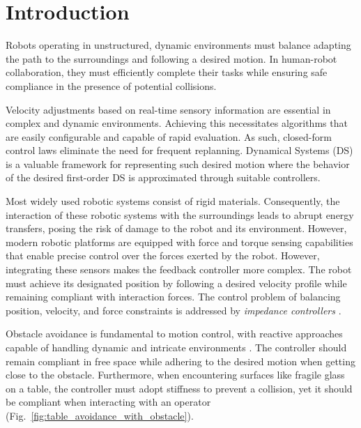 \section{Introduction}
Robots operating in unstructured, dynamic environments must balance adapting the path to the surroundings and following a desired motion. In human-robot collaboration, they must efficiently complete their tasks while ensuring safe compliance in the presence of potential collisions.

Velocity adjustments based on real-time sensory information are essential in complex and dynamic environments. Achieving this necessitates algorithms that are easily configurable and capable of rapid evaluation. As such, closed-form control laws eliminate the need for frequent replanning. Dynamical Systems (DS) is a valuable framework for representing such desired motion \cite{huber2019avoidance} where the behavior of the desired first-order DS is approximated through suitable controllers. 

Most widely used robotic systems consist of rigid materials. Consequently, the interaction of these robotic systems with the surroundings leads to abrupt energy transfers, posing the risk of damage to the robot and its environment. However, modern robotic platforms are equipped with force and torque sensing capabilities that enable precise control over the forces exerted by the robot.
However, integrating these sensors makes the feedback controller more complex. The robot must achieve its designated position by following a desired velocity profile while remaining compliant with interaction forces. The control problem of balancing position, velocity, and force constraints is addressed by \textit{impedance controllers} \iflong
\parencite{takegaki1981new, hogan1984impedance} \else \parencite{hogan1985impedance}\fi.

Obstacle avoidance is fundamental to motion control, with reactive approaches capable of handling dynamic and intricate environments \parencite{huber2019avoidance}. The controller should remain compliant in free space while adhering to the desired motion when getting close to the obstacle. Furthermore, when encountering surfaces like fragile glass on a table, the controller must adopt stiffness to prevent a collision, yet it should be compliant when interacting with an operator (Fig.~\ref{fig:table_avoidance_with_obstacle}).

